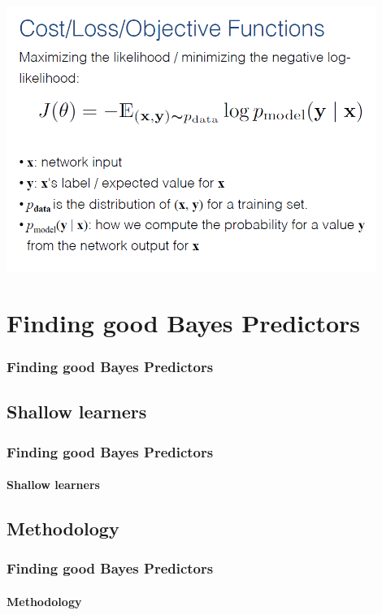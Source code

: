 \documentclass{beamer}
\begin{document}
\begin{frame}
\includegraphics[width=0.9\textwidth]{images/archi_4.PNG} 
\end{frame}

\section{Finding good Bayes Predictors}
\begin{frame}
\frametitle{Finding good Bayes Predictors}
\end{frame}

\subsection{Shallow learners}
\begin{frame}
\frametitle{Finding good Bayes Predictors}
\framesubtitle{Shallow learners}
\end{frame}

\subsection{Methodology}
\begin{frame}
\frametitle{Finding good Bayes Predictors}
\framesubtitle{Methodology}
\end{frame}
\end{document}
